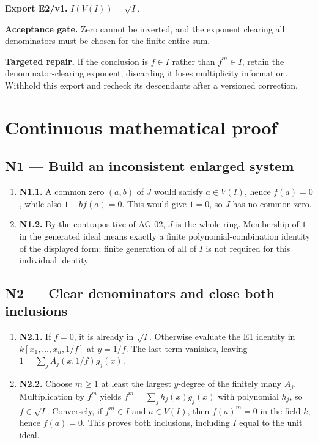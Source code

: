 \documentclass[preprint,12pt,aps,pra,showkeys,amsmath,amssymb,superscriptaddress,floatfix]{revtex4-2}
\theoremstyle{definition}
\theoremstyle{remark}
\newcommand{\field}[2]{\par\smallskip\noindent\textbf{#1.} #2\par}
\begin{document}
\field{Export E2/v1}{\(I(V(I))=\sqrt I\).}

\field{Acceptance gate}{Zero cannot be inverted, and the exponent clearing all denominators must
be chosen for the finite entire sum.}

\field{Targeted repair}{If the conclusion is \(f\in I\) rather than \(f^m\in I\), retain the
denominator-clearing exponent; discarding it loses multiplicity
information. Withhold this export and recheck its descendants after a
versioned correction.}

\endgroup\clearpage\section{Continuous mathematical proof}\label{sec:proof}

\subsection{N1 --- Build an inconsistent enlarged
system}\label{n1-build-an-inconsistent-enlarged-system}

\begin{enumerate}
\def\labelenumi{\arabic{enumi}.}
\item
  \textbf{N1.1.} A common zero \((a,b)\) of \(J\) would satisfy
  \(a\in V(I)\), hence \(f(a)=0\), while also \(1-bf(a)=0\). This would
  give \(1=0\), so \(J\) has no common zero.
\item
  \textbf{N1.2.} By the contrapositive of AG-02, \(J\) is the whole
  ring. Membership of \(1\) in the generated ideal means exactly a
  finite polynomial-combination identity of the displayed form; finite
  generation of all of \(I\) is not required for this individual
  identity.
\end{enumerate}

\subsection{N2 --- Clear denominators and close both
inclusions}\label{n2-clear-denominators-and-close-both-inclusions}

\begin{enumerate}
\def\labelenumi{\arabic{enumi}.}
\item
  \textbf{N2.1.} If \(f=0\), it is already in \(\sqrt I\). Otherwise
  evaluate the E1 identity in \(k[x_1,\ldots,x_n,1/f]\) at \(y=1/f\).
  The last term vanishes, leaving \(1=\sum_j A_j(x,1/f)g_j(x)\).
\item
  \textbf{N2.2.} Choose \(m\ge1\) at least the largest \(y\)-degree of
  the finitely many \(A_j\). Multiplication by \(f^m\) yields
  \(f^m=\sum_j h_j(x)g_j(x)\) with polynomial \(h_j\), so
  \(f\in\sqrt I\). Conversely, if \(f^m\in I\) and \(a\in V(I)\), then
  \(f(a)^m=0\) in the field \(k\), hence \(f(a)=0\). This proves both
  inclusions, including \(I\) equal to the unit ideal.
\end{enumerate}
\end{document}
